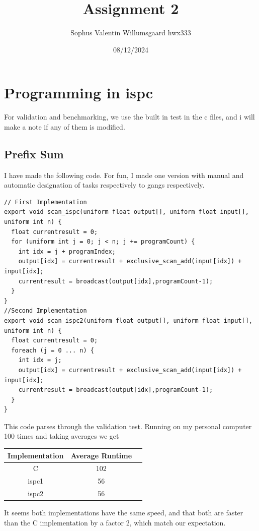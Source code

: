 \documentclass[a4paper,12pt]{article}
\newcommand{\ispc}{\textmd{ispc}}
\begin{document}
\title{Assignment 2}
\author{Sophus Valentin Willumsgaard hwx333}
\date{08/12/2024}
\maketitle

\tableofcontents %
\newpage %
\section{Programming in \ispc}
For validation and benchmarking, we use the built in test in the c files,
and i will make a note if any of them is modified.
\subsection{Prefix Sum}
I have made the following code. For fun,
I made one version with manual and automatic designation of tasks
respectively to gangs respectively.
\begin{lstlisting}
// First Implementation
export void scan_ispc(uniform float output[], uniform float input[], uniform int n) {
  float currentresult = 0;
  for (uniform int j = 0; j < n; j += programCount) {
    int idx = j + programIndex;
    output[idx] = currentresult + exclusive_scan_add(input[idx]) + input[idx];
    currentresult = broadcast(output[idx],programCount-1);
  }
}
//Second Implementation 
export void scan_ispc2(uniform float output[], uniform float input[], uniform int n) {
  float currentresult = 0;
  foreach (j = 0 ... n) {
    int idx = j;
    output[idx] = currentresult + exclusive_scan_add(input[idx]) + input[idx];
    currentresult = broadcast(output[idx],programCount-1);
  }
}
\end{lstlisting}
This code parses through the validation test.
Running on my personal computer 100 times and taking averages we get
\begin{center}
	\begin{tabular}{ |c|c|c| }
		\hline
		Implementation & Average Runtime \\
		\hline
		C              & 102             \\
		ispc1          & 56              \\
		ispc2          & 56              \\
		\hline
	\end{tabular}
\end{center}
It seems both implementations have the same speed, and that both are faster than the C implementation by a factor
2, which match our expectation.
\end{document}

